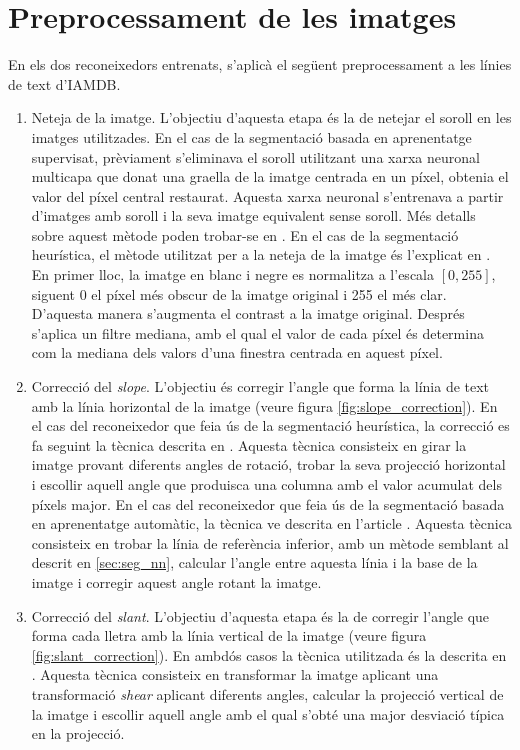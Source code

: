\section{Preprocessament de les imatges}
En els dos reconeixedors entrenats, s'aplicà el següent preprocessament a les línies de text d'IAMDB.
\begin{enumerate}
\item Neteja de la imatge. L'objectiu d'aquesta etapa és la de netejar el soroll en les imatges utilitzades. En el cas de la segmentació basada en aprenentatge supervisat, prèviament s'eliminava el soroll utilitzant una xarxa neuronal multicapa que donat una graella de la imatge centrada en un píxel, obtenia el valor del píxel central restaurat. Aquesta xarxa neuronal s'entrenava a partir d'imatges amb soroll i la seva imatge equivalent sense soroll. Més detalls sobre aquest mètode poden trobar-se en \cite{DBLP:conf/pris/Gorbe-MoyaEZB08,espana2011improving}. En el cas de la segmentació heurística, el mètode utilitzat per a la neteja de la imatge és l'explicat en \cite{Pastor07}. En primer lloc, la imatge en blanc i negre es normalitza a l'escala $[0,255]$, siguent 0 el píxel més obscur de la imatge original i 255 el més clar. D'aquesta manera s'augmenta el contrast a la imatge original. Després s'aplica un filtre mediana, amb el qual el valor de cada píxel és determina com la mediana dels valors d'una finestra centrada en aquest píxel.

\item Correcció del \emph{slope}. L'objectiu és corregir l'angle que forma la línia de text amb la línia horizontal de la imatge (veure figura \ref{fig:slope_correction}). En el cas del reconeixedor que feia ús de la segmentació heurística, la correcció es fa seguint la tècnica descrita en \cite{Pastor07}. Aquesta tècnica consisteix en girar la imatge provant diferents angles de rotació, trobar la seva projecció horizontal i escollir aquell angle que produisca una columna amb el valor acumulat dels píxels major. En el cas del reconeixedor que feia ús de la segmentació basada en aprenentatge automàtic, la tècnica ve descrita en l'article \cite{DBLP:conf/pris/Gorbe-MoyaEZB08}. Aquesta tècnica consisteix en trobar la línia de referència inferior, amb un mètode semblant al descrit en \ref{sec:seg_nn}, calcular l'angle entre aquesta línia i la base de la imatge i corregir aquest angle rotant la imatge.

\item Correcció del \emph{slant}. L'objectiu d'aquesta etapa és la de corregir l'angle que forma cada lletra amb la línia vertical de la imatge (veure figura \ref{fig:slant_correction}). En ambdós casos la tècnica utilitzada és la descrita en \cite{pastor2004projection,Romero05,Pastor07}. Aquesta tècnica consisteix en transformar la imatge aplicant una transformació \emph{shear} aplicant diferents angles, calcular la projecció vertical de la imatge i escollir aquell angle amb el qual s'obté una major desviació típica en la projecció.


\end{enumerate}
